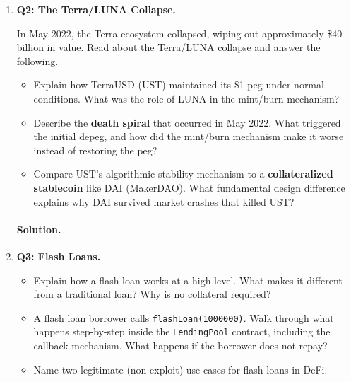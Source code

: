 \documentclass{article}
\begin{document}
\begin{enumerate}
    \paragraph{Solution.}

    \vspace{4em}

    \item \textbf{Q2: The Terra/LUNA Collapse.}

    In May 2022, the Terra ecosystem collapsed, wiping out approximately \$40 billion in value. Read about the Terra/LUNA collapse and answer the following.

    \begin{itemize}
        \item[(a)] Explain how TerraUSD (UST) maintained its \$1 peg under normal conditions. What was the role of LUNA in the mint/burn mechanism?
        \item[(b)] Describe the \textbf{death spiral} that occurred in May 2022. What triggered the initial depeg, and how did the mint/burn mechanism make it worse instead of restoring the peg?
        \item[(c)] Compare UST's algorithmic stability mechanism to a \textbf{collateralized stablecoin} like DAI (MakerDAO). What fundamental design difference explains why DAI survived market crashes that killed UST?
    \end{itemize}

    \paragraph{Solution.}

    \vspace{4em}

    \item \textbf{Q3: Flash Loans.}

    \begin{itemize}
        \item[(a)] Explain how a flash loan works at a high level. What makes it different from a traditional loan? Why is no collateral required?
        \item[(b)] A flash loan borrower calls \texttt{flashLoan(1000000)}. Walk through what happens step-by-step inside the \texttt{LendingPool} contract, including the callback mechanism. What happens if the borrower does not repay?
        \item[(c)] Name two legitimate (non-exploit) use cases for flash loans in DeFi.
    \end{itemize}


\end{enumerate}
\end{document}
